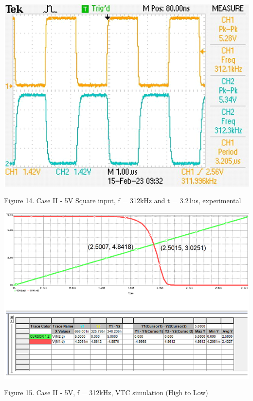 \documentclass[conference]{IEEEtran}
\begin{document}
\begin{center}
    \centerline{\includegraphics[scale = 0.6]{figures/case2_lab_results.png}}
    Figure 14. Case II - 5V Square input, f = 312kHz and t = 3.21us, experimental
\end{center}

\begin{center}
    \centerline{\includegraphics[scale = 0.55]{figures/case2_results_HL.png}}
    Figure 15. Case II - 5V, f = 312kHz, VTC simulation (High to Low)
\end{center}
\end{document}

